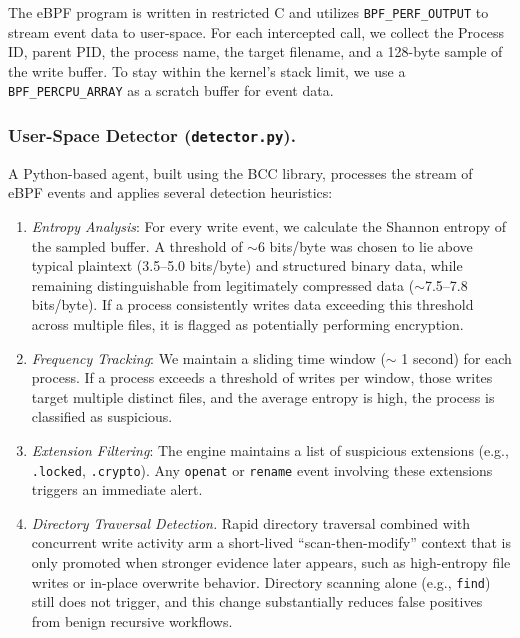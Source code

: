 \documentclass[twocolumn, 10pt]{scrartcl}
\begin{document}
The eBPF program is written in restricted C and utilizes \texttt{BPF\_PERF\_OUTPUT} to stream event data to user-space. For each intercepted call, we collect the Process ID, parent PID, the process name, the target filename, and a 128-byte sample of the write buffer. To stay within the kernel's stack limit, we use a \texttt{BPF\_PERCPU\_ARRAY} as a scratch buffer for event data.

\subsubsection{User-Space Detector (\texttt{detector.py}).}
A Python-based agent, built using the BCC library, processes the stream of eBPF 
events and applies several detection heuristics:
\begin{enumerate}
    \item \textit{Entropy Analysis}: For every write event, we calculate the Shannon 
    entropy of the sampled buffer. A threshold of $\sim 6$ bits/byte was chosen to lie 
    above typical plaintext (3.5--5.0 bits/byte) and structured binary data, while 
    remaining distinguishable from legitimately compressed data 
    ($\sim$7.5--7.8 bits/byte). If a process consistently writes 
    data exceeding this threshold across multiple files, it is flagged as potentially 
    performing encryption.
    
    \item \textit{Frequency Tracking}: We maintain a sliding time window ($\sim$ 
    1 second) for each process. If a process exceeds a threshold of writes per window, 
    those writes target multiple distinct files, and the average entropy is high, the 
    process is classified as suspicious. 
    
    \item \textit{Extension Filtering}: The engine maintains a list of suspicious 
    extensions (e.g., \texttt{.locked}, \texttt{.crypto}). Any \texttt{openat} or 
    \texttt{rename} event involving these extensions triggers an immediate alert. 
    
    \item \textit{Directory Traversal Detection.} Rapid directory traversal combined with concurrent write activity arm a short-lived 
    ``scan-then-modify'' context that is only promoted when stronger evidence later 
    appears, such as high-entropy file writes or in-place overwrite behavior. 
    Directory scanning alone (e.g., \texttt{find}) still does not trigger, and this 
    change substantially reduces false positives from benign recursive workflows.
    

\end{enumerate}
\end{document}
